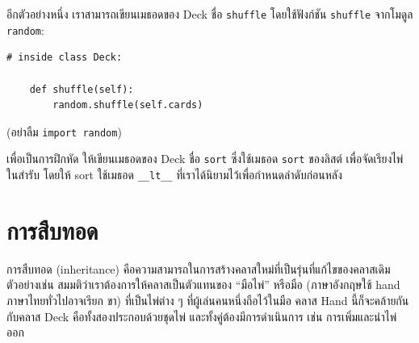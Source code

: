 อีกตัวอย่างหนึ่ง เราสามารถเขียนเมธอดของ Deck ชื่อ {\tt shuffle} โดยใช้ฟังก์ชัน {\tt shuffle} จากโมดูล {\tt random}:


\begin{verbatim}
# inside class Deck:
            
    def shuffle(self):
        random.shuffle(self.cards)
\end{verbatim}
%
(อย่าลืม {\tt import random})


เพื่อเป็นการฝึกหัด ให้เขียนเมธอดของ Deck ชื่อ {\tt sort} ซึ่งใช้เมธอด {\tt sort} ของลิสต์ เพื่อจัดเรียงไพ่ในสำรับ  
โดยให้ sort ใช้เมธอด \verb"__lt__" ที่เราได้นิยามไว้เพื่อกำหนดลำดับก่อนหลัง
 



\section{การสืบทอด} %


การสืบทอด (inheritance) คือความสามารถในการสร้างคลาสใหม่ที่เป็นรุ่นที่แก้ไขของคลาสเดิม
ตัวอย่างเช่น สมมติว่าเราต้องการให้คลาสเป็นตัวแทนของ ``มือไพ่'' หรือมือ  (ภาษาอังกฤษใช้ hand ภาษาไทยทั่วไปอาจเรียก ขา)
ที่เป็นไพ่ต่าง ๆ ที่ผู้เล่นคนหนึ่งถือไว้ในมือ 
คลาส Hand นี้ก็จะคล้ายกันกับคลาส Deck คือทั้งสองประกอบด้วยชุดไพ่ และทั้งคู่ต้องมีการดำเนินการ เช่น การเพิ่มและนำไพ่ออก


